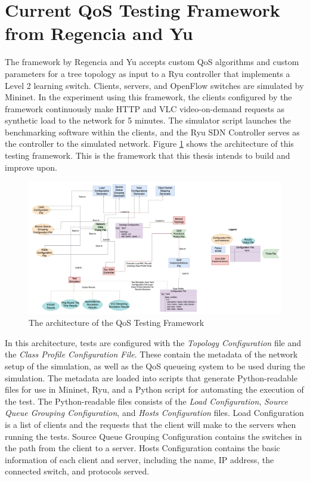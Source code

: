 \section{Current QoS Testing Framework from Regencia and Yu}
The framework by Regencia and Yu \cite{yang_introducing_2022} accepts custom QoS algorithms and custom parameters for a tree topology as input to a Ryu controller that implements a Level 2 learning switch. Clients, servers, and OpenFlow switches are simulated by Mininet. In the experiment using this framework, the clients configured by the framework continuously make HTTP and VLC video-on-demand requests as synthetic load to the network for 5 minutes. The simulator script launches the benchmarking software within the clients, and the Ryu SDN Controller serves as the controller to the simulated network. Figure \ref{fig:original_architecture} shows the architecture of this testing framework. This is the framework that this thesis intends to build and improve upon.

\begin{figure}[htbp!]
    \centering
    \includegraphics[width=\textwidth]{Figures/original_architecture.png}
    \caption{The architecture of the QoS Testing Framework}
    \label{fig:original_architecture}
\end{figure}

In this architecture, tests are configured with the \textit{Topology Configuration} file and the \textit{Class Profile Configuration File}. These contain the metadata of the network setup of the simulation, as well as the QoS queueing system to be used during the simulation. The metadata are loaded into scripts that generate Python-readable files for use in Mininet, Ryu, and a Python script for automating the execution of the test. The Python-readable files consists of the \textit{Load Configuration}, \textit{Source Queue Grouping Configuration}, and \textit{Hosts Configuration} files. Load Configuration is a list of clients and the requests that the client will make to the servers when running the tests. Source Queue Grouping Configuration contains the switches in the path from the client to a server. Hosts Configuration contains the basic information of each client and server, including the name, IP address, the connected switch, and protocols served.

